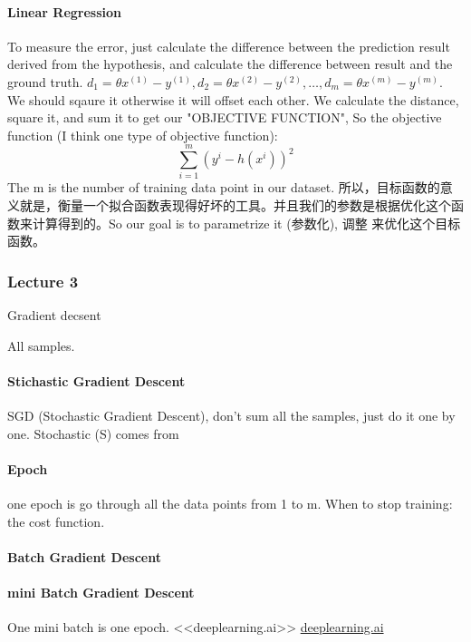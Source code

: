 \documentclass[a4paper]{article}
\begin{document}
\paragraph{Linear Regression}
To measure the error, just calculate the difference between the prediction result derived from the hypothesis, and calculate the difference between result and the ground truth. $d_{1}=\theta x^{(1)}-y^{(1)}, d_{2}=\theta x^{(2)}-y^{(2)}, \dots, d_{m}=\theta x^{(m)}-y^{(m)}$. We should sqaure it otherwise it will offset each other.
\newline
We calculate the distance, square it, and sum it to get our "OBJECTIVE FUNCTION", So the objective function (I think one type of objective function):
\begin{equation}
	\sum_{i=1}^{m}(y^{i}-h(x^{i}))^{2}
\end{equation}
The m is the number of training data point in our dataset.
\newline
所以，目标函数的意义就是，衡量一个拟合函数表现得好坏的工具。并且我们的参数是根据优化这个函数来计算得到的。So our goal is to parametrize it (参数化), 调整 \theta 来优化这个目标函数。

\subsubsection{Lecture 3}
Gradient decsent 

All samples. 
\paragraph{Stichastic Gradient Descent} SGD (Stochastic Gradient Descent), don't sum all the samples, just do it one by one.
Stochastic (S) comes from 

\paragraph{Epoch} one epoch is go through all the data points from 1 to m.
When to stop training: the cost function.

\paragraph{Batch Gradient Descent}
\paragraph{mini Batch Gradient Descent}
One mini batch is one epoch. <<deeplearning.ai>> \url{deeplearning.ai} 
\end{document}
